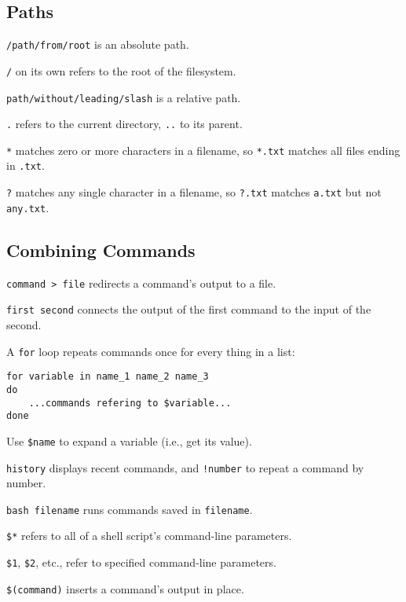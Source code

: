 \subsection*{Paths}

\begin{swcitemize}
\item
  \texttt{/path/from/root} is an absolute path.
\item
  \texttt{/} on its own refers to the root of the filesystem.
\item
  \texttt{path/without/leading/slash} is a relative path.
\item
  \texttt{.} refers to the current directory, \texttt{..} to its parent.
\item
  \texttt{*} matches zero or more characters in a filename, so
  \texttt{*.txt} matches all files ending in \texttt{.txt}.
\item
  \texttt{?} matches any single character in a filename, so
  \texttt{?.txt} matches \texttt{a.txt} but not \texttt{any.txt}.
\end{swcitemize}

\subsection*{Combining Commands}

\begin{swcitemize}
\item
  \texttt{command \textgreater{} file} redirects a command's output to a
  file.
\item
  \texttt{first \textbar{} second} connects the output of the first
  command to the input of the second.
\item
  A \texttt{for} loop repeats commands once for every thing in a list:

\begin{Verbatim}
for variable in name_1 name_2 name_3
do
    ...commands refering to $variable...
done
\end{Verbatim}
\item
  Use \texttt{\$name} to expand a variable (i.e., get its value).
\item
  \texttt{history} displays recent commands, and \texttt{!number} to
  repeat a command by number.
\item
  \texttt{bash filename} runs commands saved in \texttt{filename}.
\item
  \texttt{\$*} refers to all of a shell script's command-line
  parameters.
\item
  \texttt{\$1}, \texttt{\$2}, etc., refer to specified command-line
  parameters.
\item
  \texttt{\$(command)} inserts a command's output in place.
\end{swcitemize}

